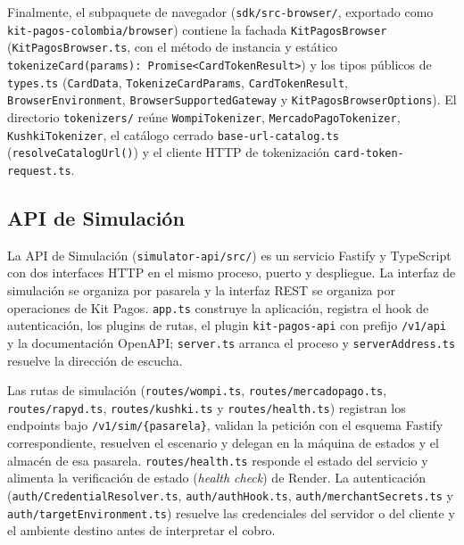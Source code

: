 \begin{sloppypar}Finalmente, el subpaquete de navegador (\texttt{sdk/src-browser/}, exportado como \texttt{kit-pagos-colombia/browser}) contiene la fachada \texttt{KitPagosBrowser} (\texttt{KitPagosBrowser.ts}, con el método de instancia y estático \texttt{tokenizeCard(params): Promise<CardTokenResult>}) y los tipos públicos de \texttt{types.ts} (\texttt{CardData}, \texttt{TokenizeCardParams}, \texttt{CardTokenResult}, \texttt{BrowserEnvironment}, \texttt{BrowserSupportedGateway} y \texttt{KitPagosBrowserOptions}). El directorio \texttt{tokenizers/} reúne \texttt{WompiTokenizer}, \texttt{MercadoPagoTokenizer}, \texttt{KushkiTokenizer}, el catálogo cerrado \texttt{base-url-catalog.ts} (\texttt{resolveCatalogUrl()}) y el cliente HTTP de tokenización \texttt{card-token-request.ts}.\end{sloppypar}

\subsection{API de Simulación}
La API de Simulación (\texttt{simulator-api/src/}) es un servicio Fastify y TypeScript con dos interfaces HTTP en el mismo proceso, puerto y despliegue. La interfaz de simulación se organiza por pasarela y la interfaz REST se organiza por operaciones de Kit Pagos. \texttt{app.ts} construye la aplicación, registra el hook de autenticación, los plugins de rutas, el plugin \texttt{kit-pagos-api} con prefijo \texttt{/v1/api} y la documentación OpenAPI; \texttt{server.ts} arranca el proceso y \texttt{serverAddress.ts} resuelve la dirección de escucha.

Las rutas de simulación (\texttt{routes/wompi.ts}, \texttt{routes/mercadopago.ts}, \texttt{routes/rapyd.ts}, \texttt{routes/kushki.ts} y \texttt{routes/health.ts}) registran los endpoints bajo \texttt{/v1/sim/\{pasarela\}}, validan la petición con el esquema Fastify correspondiente, resuelven el escenario y delegan en la máquina de estados y el almacén de esa pasarela. \texttt{routes/health.ts} responde el estado del servicio y alimenta la verificación de estado (\textit{health check}) de Render. La autenticación (\texttt{auth/CredentialResolver.ts}, \texttt{auth/authHook.ts}, \texttt{auth/merchantSecrets.ts} y \texttt{auth/targetEnvironment.ts}) resuelve las credenciales del servidor o del cliente y el ambiente destino antes de interpretar el cobro.

